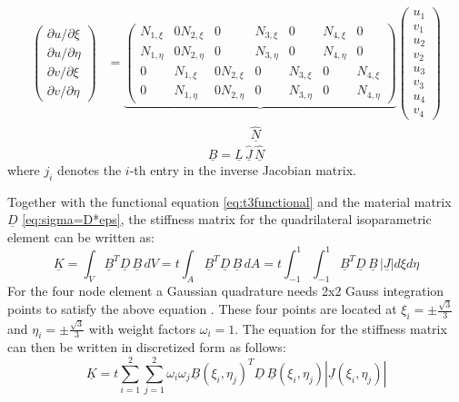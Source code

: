   \begin{align}
  \begin{pmatrix}
  {\partial u}/{\partial \xi} \\ {\partial u}/{\partial \eta} \\ {\partial v}/{\partial \xi} \\ {\partial v}/{\partial \eta}
  \end{pmatrix} &= \underbrace{\begin{pmatrix}
  N_{1,\xi}  & 0 N_{2,\xi}  & 0 & N_{3,\xi}  & 0 & N_{4,\xi}  & 0\\
  N_{1,\eta} & 0 N_{2,\eta} & 0 & N_{3,\eta} & 0 & N_{4,\eta} & 0\\
  0 & N_{1,\xi}  & 0 N_{2,\xi}  & 0 & N_{3,\xi}  & 0 & N_{4,\xi}\\
  0 & N_{1,\eta} & 0 N_{2,\eta} & 0 & N_{3,\eta} & 0 & N_{4,\eta}
  \end{pmatrix}} \begin{pmatrix}
  u_1\\v_1\\u_2\\v_2\\u_3\\v_3\\u_4\\v_4
  \end{pmatrix}\\
  &\qquad\qquad\qquad\qquad\qquad\quad\; \underline{\hat{N}} \nonumber
  \end{align}
  \begin{equation}
  \underline{B} = \underline{L}\,\underline{\hat{J}}\,\underline{\hat{N}}
  \end{equation}
  where $j_{i}$ denotes the $i$-th entry in the inverse Jacobian matrix.

  Together with the functional equation \ref{eq:t3functional} and the material matrix $\underline{D}$ \ref{eq:sigma=D*eps}, the stiffness matrix for the quadrilateral isoparametric element can be written as:
  \begin{equation}
  \underline{K} = \int_V \underline{B}^T \underline{D}\,\underline{B}\, dV = t\int_A \underline{B}^T \underline{D}\,\underline{B}\, dA = t\int_{-1}^{1}\int_{-1}^{1} \underline{B}^T \underline{D}\,\underline{B}\, |\underline{J}| d\xi d\eta
  \end{equation}
  For the four node element a Gaussian quadrature needs 2x2 Gauss integration points to satisfy the above equation \cite{steinke2005finite}. These four points are located at $\xi_i = \pm \frac{\sqrt{3}}{3}$ and $\eta_i = \pm \frac{\sqrt{3}}{3}$ with weight factors $\omega_i = 1$. The equation for the stiffness matrix can then be written in discretized form as follows:
  \begin{equation}
  \underline{K} = t \sum_{i=1}^{2} \sum_{j=1}^{2} \omega_i \omega_j \underline{B}(\xi_i,\eta_j)^T \underline{D}\, \underline{B}(\xi_i,\eta_j) |\underline{J}(\xi_i,\eta_j)|
  \end{equation}
 
